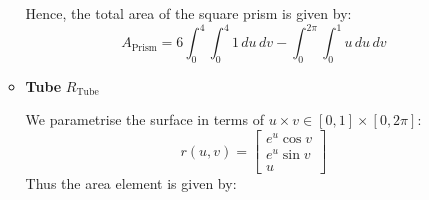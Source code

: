 \documentclass[a4paper, 11pt]{article}
\begin{document}
\begin{enumerate}[label=(\alph*)]
\begin{itemize}
\begin{mdframed}
			            Hence, the total area of the square prism is given by:
			            $$A_\text{Prism}=6\int_0^4\int_0^4 1\,du\,dv-\int_0^{2\pi} \int_0^1u\,du\,dv$$

		            \end{mdframed}

		            \pagebreak
		      \item \textbf{Tube} $R_\text{Tube}$
		            \begin{mdframed}
			            We parametrise the surface in terms of $u\times v\in[0,1]\times[0,2\pi]$:
			            $$r(u,v)=\begin{bmatrix}
					            e^u \cos v \\
					            e^u \sin v \\
					            u
				            \end{bmatrix}
			            $$
			            Thus the area element is given by:


\end{mdframed}
\end{itemize}
\end{enumerate}
\end{document}
